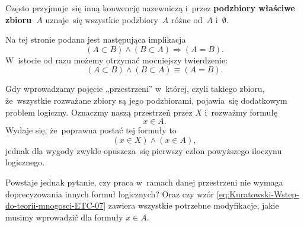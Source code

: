 \documentclass[a4paper,11pt]{article}
\numberwithin{equation}{section}
\begin{document}
\VerSpaceFour





\noindent
{} Często przyjmuje~się inną konwencję nazewniczą i~przez
\textbf{podzbiory właściwe zbioru~$A$} uznaje~się wszystkie podzbiory~$A$
różne od~$A$ i~$\emptyset$.

\VerSpaceFour





\noindent
{} Na tej stronie podana jest następująca implikacja
\begin{equation}
  \label{eq:Kuratowski-Wstep-do-teorii-mnogosci-ETC-05}
  ( A \subset B ) \land ( B \subset A ) \Rightarrow ( A = B ).
\end{equation}
W~istocie od razu możemy otrzymać mocniejszy twierdzenie:
\begin{equation}
  \label{eq:Kuratowski-Wstep-do-teorii-mnogosci-ETC-06}
  ( A \subset B ) \land ( B \subset A ) \equiv ( A = B ).
\end{equation}

\VerSpaceFour





\noindent
{} Gdy wprowadzamy pojęcie „przestrzeni” w~której, czyli takiego
zbioru, że~wszystkie rozważane zbiory są jego podzbiorami, pojawia~się
dodatkowym problem logiczny. Oznaczmy naszą przestrzeń przez $X$ i~rozważmy
formułę
\begin{equation}
  \label{eq:Kuratowski-Wstep-do-teorii-mnogosci-ETC-06}
  x \in A.
\end{equation}
Wydaje się, że~poprawna postać tej formuły to
\begin{equation}
  \label{eq:Kuratowski-Wstep-do-teorii-mnogosci-ETC-07}
  ( x \in X ) \land ( x \in A ),
\end{equation}
jednak dla wygody zwykle opuszcza~się pierwszy człon powyższego iloczynu
logicznego.

Powstaje jednak pytanie, czy praca w~ramach danej przestrzeni nie wymaga
doprecyzowania innych formuł logicznych? Oraz czy wzór
\eqref{eq:Kuratowski-Wstep-do-teorii-mnogosci-ETC-07}
zawiera wszystkie potrzebne modyfikacje, jakie musimy wprowadzić dla formuły
$x \in A$.

\VerSpaceFour
\end{document}
